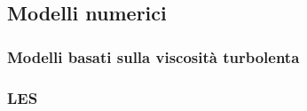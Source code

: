 \subsection{Modelli numerici}
\subsubsection{Modelli basati sulla viscosità turbolenta}
\subsubsection{LES}
